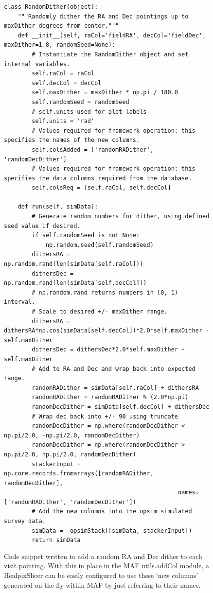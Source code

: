 \documentclass[]{spie}  %
\begin{document}
\begin{figure}
\centering
\begin{lstlisting}[frame=single]
class RandomDither(object):
    """Randomly dither the RA and Dec pointings up to maxDither degrees from center."""
    def __init__(self, raCol='fieldRA', decCol='fieldDec', maxDither=1.8, randomSeed=None):
        # Instantiate the RandomDither object and set internal variables. 
        self.raCol = raCol
        self.decCol = decCol
        self.maxDither = maxDither * np.pi / 180.0
        self.randomSeed = randomSeed
        # self.units used for plot labels
        self.units = 'rad'
        # Values required for framework operation: this specifies the names of the new columns.
        self.colsAdded = ['randomRADither', 'randomDecDither']
        # Values required for framework operation: this specifies the data columns required from the database.
        self.colsReq = [self.raCol, self.decCol]

    def run(self, simData):
        # Generate random numbers for dither, using defined seed value if desired.
        if self.randomSeed is not None:
            np.random.seed(self.randomSeed)
        dithersRA = np.random.rand(len(simData[self.raCol]))
        dithersDec = np.random.rand(len(simData[self.decCol]))
        # np.random.rand returns numbers in [0, 1) interval.
        # Scale to desired +/- maxDither range.
        dithersRA = dithersRA*np.cos(simData[self.decCol])*2.0*self.maxDither - self.maxDither
        dithersDec = dithersDec*2.0*self.maxDither - self.maxDither
        # Add to RA and Dec and wrap back into expected range.
        randomRADither = simData[self.raCol] + dithersRA
        randomRADither = randomRADither % (2.0*np.pi)
        randomDecDither = simData[self.decCol] + dithersDec
        # Wrap dec back into +/- 90 using truncate
        randomDecDither = np.where(randomDecDither < -np.pi/2.0, -np.pi/2.0, randomDecDither)
        randomDecDither = np.where(randomDecDither > np.pi/2.0, np.pi/2.0, randomDecDither) 
        stackerInput = np.core.records.fromarrays([randomRADither, randomDecDither],
                                                  names=['randomRADither', 'randomDecDither'])
        # Add the new columns into the opsim simulated survey data.
        simData = _opsimStack([simData, stackerInput])
        return simData
\end{lstlisting}
\caption[]
{\label{fig:randomRADECcode} Code snippet written to add a random RA
  and Dec dither to each visit pointing. With this in place in the MAF
utils.addCol module, a HealpixSlicer can be easily configured to use
these `new columns' generated on the fly within MAF by just referring
to their names. }
\end{figure}
\end{document}
